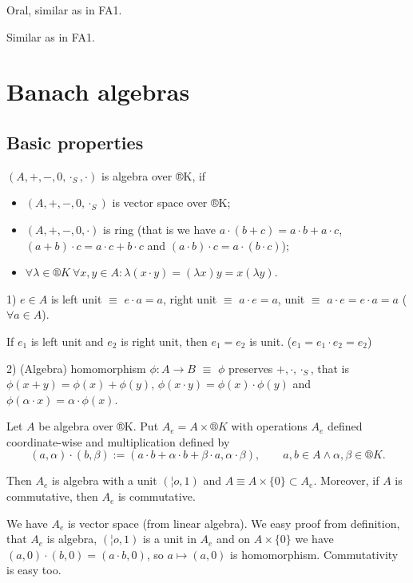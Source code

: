 \documentclass[12pt]{article}					%
\begin{document}

\begin{poznamka}[Exam]
	Oral, similar as in FA1.
\end{poznamka}

\begin{poznamka}[Credit]
	Similar as in FA1.
\end{poznamka}

\section{Banach algebras}
\subsection{Basic properties}
\begin{definice}[Algebra]
	$(A, +, -, 0, ·_S, ·)$ is algebra over ®K, if

	\begin{itemize}
		\item $(A, +, -, 0, ·_S)$ is vector space over ®K;
		\item $(A, +, -, 0, ·)$ is ring (that is we have $a·(b + c) = a·b + a·c$, $(a + b)·c = a·c + b·c$ and $(a·b)·c = a·(b·c)$);
		\item $\forall \lambda \in ®K\ \forall x, y \in A: \lambda(x·y) = (\lambda x)y = x(\lambda y)$.
	\end{itemize}
\end{definice}

\begin{dusledek}
	1) $e \in A$ is left unit $≡$ $e·a = a$, right unit $≡$ $a·e = a$, unit $≡$ $a·e = e·a = a$ ($\forall a \in A$).

	If $e_1$ is left unit and $e_2$ is right unit, then $e_1 = e_2$ is unit. ($e_1 = e_1·e_2 = e_2$)

	2) (Algebra) homomorphism $\phi: A \rightarrow B$ $≡$ $\phi$ preserves $+, ·, ·_S$, that is $\phi(x + y) = \phi(x) + \phi(y)$, $\phi(x·y) = \phi(x)·\phi(y)$ and $\phi(\alpha·x) = \alpha·\phi(x)$.
\end{dusledek}

\begin{tvrzeni}
	Let $A$ be algebra over ®K. Put $A_e = A \times ®K$ with operations $A_e$ defined coordinate-wise and multiplication defined by
	$$ (a, \alpha)·(b, \beta) := (a·b + \alpha·b + \beta·a, \alpha·\beta), \qquad a, b \in A \land \alpha, \beta \in ®K. $$

	Then $A_e$ is algebra with a unit $(¦o, 1)$ and $A ≡ A \times \{0\} \subset A_e$. Moreover, if $A$ is commutative, then $A_e$ is commutative.

	\begin{dukazin}
		We have $A_e$ is vector space (from linear algebra). We easy proof from definition, that $A_e$ is algebra, $(¦o, 1)$ is a unit in $A_e$ and on $A \times \{0\}$ we have $(a, 0)·(b, 0) = (a·b, 0)$, so $a \mapsto (a, 0)$ is homomorphism. Commutativity is easy too.
	\end{dukazin}
\end{tvrzeni}
\end{document}

